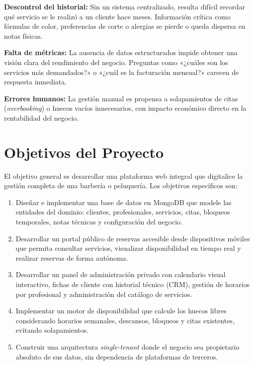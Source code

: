 \textbf{Descontrol del historial:} Sin un sistema centralizado, resulta dif\'icil recordar qu\'e servicio se le realiz\'o a un cliente hace meses. Informaci\'on cr\'itica como f\'ormulas de color, preferencias de corte o alergias se pierde o queda dispersa en notas f\'isicas.

\textbf{Falta de m\'etricas:} La ausencia de datos estructurados impide obtener una visi\'on clara del rendimiento del negocio. Preguntas como «¿cuáles son los servicios más demandados?» o «¿cuál es la facturación mensual?» carecen de respuesta inmediata.

\textbf{Errores humanos:} La gesti\'on manual es propensa a solapamientos de citas (\textit{overbooking}) o huecos vac\'ios innecesarios, con impacto econ\'omico directo en la rentabilidad del negocio.

\section{Objetivos del Proyecto}\label{sec:objetivos}

El objetivo general es desarrollar una plataforma web integral que digitalice la gesti\'on completa de una barber\'ia o peluquer\'ia. Los objetivos espec\'ificos son:

\begin{enumerate}
    \item Dise\~nar e implementar una base de datos en MongoDB que modele las entidades del dominio: clientes, profesionales, servicios, citas, bloqueos temporales, notas t\'ecnicas y configuraci\'on del negocio.

    \item Desarrollar un portal p\'ublico de reservas accesible desde dispositivos m\'oviles que permita consultar servicios, visualizar disponibilidad en tiempo real y realizar reservas de forma aut\'onoma.

    \item Desarrollar un panel de administraci\'on privado con calendario visual interactivo, fichas de cliente con historial t\'ecnico (CRM), gesti\'on de horarios por profesional y administraci\'on del cat\'alogo de servicios.

    \item Implementar un motor de disponibilidad que calcule los huecos libres considerando horarios semanales, descansos, bloqueos y citas existentes, evitando solapamientos.

    \item Construir una arquitectura \textit{single-tenant} donde el negocio sea propietario absoluto de sus datos, sin dependencia de plataformas de terceros.
\end{enumerate}

